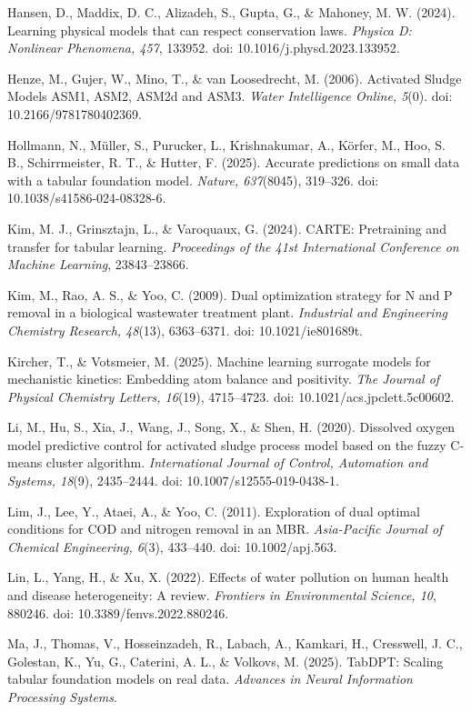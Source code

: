 \documentclass[a4paper,fleqn]{cas-sc}
\begin{document}
\noindent Hansen, D., Maddix, D. C., Alizadeh, S., Gupta, G., \& Mahoney, M. W. (2024). Learning physical models that can respect conservation laws. \textit{Physica D: Nonlinear Phenomena, 457}, 133952. doi: 10.1016/j.physd.2023.133952.

\noindent Henze, M., Gujer, W., Mino, T., \& van Loosedrecht, M. (2006). Activated Sludge Models ASM1, ASM2, ASM2d and ASM3. \textit{Water Intelligence Online, 5}(0). doi: 10.2166/9781780402369.

\noindent Hollmann, N., M\"uller, S., Purucker, L., Krishnakumar, A., K\"orfer, M., Hoo, S. B., Schirrmeister, R. T., \& Hutter, F. (2025). Accurate predictions on small data with a tabular foundation model. \textit{Nature, 637}(8045), 319--326. doi: 10.1038/s41586-024-08328-6.

\noindent Kim, M. J., Grinsztajn, L., \& Varoquaux, G. (2024). CARTE: Pretraining and transfer for tabular learning. \textit{Proceedings of the 41st International Conference on Machine Learning}, 23843--23866.

\noindent Kim, M., Rao, A. S., \& Yoo, C. (2009). Dual optimization strategy for N and P removal in a biological wastewater treatment plant. \textit{Industrial and Engineering Chemistry Research, 48}(13), 6363--6371. doi: 10.1021/ie801689t.

\noindent Kircher, T., \& Votsmeier, M. (2025). Machine learning surrogate models for mechanistic kinetics: Embedding atom balance and positivity. \textit{The Journal of Physical Chemistry Letters, 16}(19), 4715--4723. doi: 10.1021/acs.jpclett.5c00602.

\noindent Li, M., Hu, S., Xia, J., Wang, J., Song, X., \& Shen, H. (2020). Dissolved oxygen model predictive control for activated sludge process model based on the fuzzy C-means cluster algorithm. \textit{International Journal of Control, Automation and Systems, 18}(9), 2435--2444. doi: 10.1007/s12555-019-0438-1.

\noindent Lim, J., Lee, Y., Ataei, A., \& Yoo, C. (2011). Exploration of dual optimal conditions for COD and nitrogen removal in an MBR. \textit{Asia-Pacific Journal of Chemical Engineering, 6}(3), 433--440. doi: 10.1002/apj.563.

\noindent Lin, L., Yang, H., \& Xu, X. (2022). Effects of water pollution on human health and disease heterogeneity: A review. \textit{Frontiers in Environmental Science, 10}, 880246. doi: 10.3389/fenvs.2022.880246.

\noindent Ma, J., Thomas, V., Hosseinzadeh, R., Labach, A., Kamkari, H., Cresswell, J. C., Golestan, K., Yu, G., Caterini, A. L., \& Volkovs, M. (2025). TabDPT: Scaling tabular foundation models on real data. \textit{Advances in Neural Information Processing Systems}.
\end{document}
